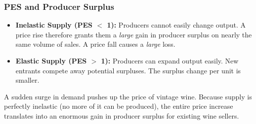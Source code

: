 \documentclass[11pt, a4paper, twoside]{book}
\begin{document}
\subsubsection{PES and Producer Surplus}

\begin{itemize}
  \item \textbf{Inelastic Supply (PES $<$ 1):} Producers cannot easily change output. A price rise therefore grants them a \emph{large} gain in producer surplus on nearly the same volume of sales. A price fall causes a \emph{large} loss.
  \item \textbf{Elastic Supply (PES $>$ 1):} Producers can expand output easily. New entrants compete away potential surpluses. The surplus change per unit is smaller.
\end{itemize}

\begin{example}
A sudden surge in demand pushes up the price of vintage wine. Because supply is perfectly inelastic (no more of it can be produced), the entire price increase translates into an enormous gain in producer surplus for existing wine sellers.
\end{example}
\end{document}
